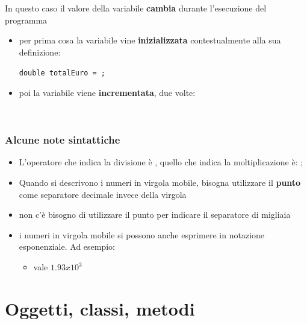 \begin{frame}
\begin{block}{}
In questo caso il valore della variabile  \textbf{cambia} durante l'esecuzione del programma
\begin{itemize}
\item per prima cosa la variabile vine \textbf{inizializzata} contestualmente alla sua \alert{definizione}:
\begin{center}
\texttt{\alert{double} totalEuro = ;}
\end{center}
\item poi la variabile viene \textbf{incrementata}, due volte:
\begin{center}
\texttt{\\}
\texttt{}
\end{center}
\end{itemize}
\end{block}
\end{frame}

\begin{frame}
\frametitle{Alcune note sintattiche}
\begin{block}{}
\begin{itemize}
\item L'operatore che indica la divisione è \textCl{/}, quello che indica la moltiplicazione è: \textCl{*};
\item Quando si descrivono i numeri in virgola mobile, bisogna utilizzare il \textbf{punto} come separatore decimale invece
della virgola
\item non c'è bisogno di utilizzare il punto per indicare il separatore di migliaia
\item i numeri in virgola mobile si possono anche esprimere in \alert{notazione esponenziale}. Ad esempio: 
\begin{itemize}
\item {} vale \alert{$1.93 x 10^{3}$}
\end{itemize}
\end{itemize}
\end{block}
\end{frame}

\section*{Oggetti, classi, metodi}
\begin{frame}
\begin{block}{}
\begin{huge}
\large{\begin{center}
\end{center}}
\end{huge}
\end{block}
\end{frame}
